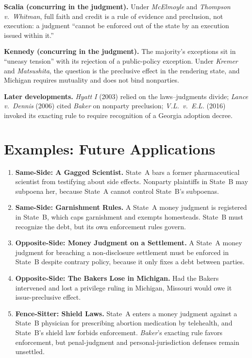 \documentclass[12pt]{article}
\begin{document}
\textbf{Scalia (concurring in the judgment).} Under \textit{McElmoyle} and \textit{Thompson v.\ Whitman}, full faith and credit is a rule of evidence and preclusion, not execution: a judgment ``cannot be enforced out of the state by an execution issued within it.''

\textbf{Kennedy (concurring in the judgment).} The majority's exceptions sit in ``uneasy tension'' with its rejection of a public-policy exception. Under \textit{Kremer} and \textit{Matsushita}, the question is the preclusive effect in the rendering state, and Michigan requires mutuality and does not bind nonparties.

\textbf{Later developments.} \textit{Hyatt I} (2003) relied on the laws--judgments divide; \textit{Lance v.\ Dennis} (2006) cited \textit{Baker} on nonparty preclusion; \textit{V.L.\ v.\ E.L.} (2016) invoked its exacting rule to require recognition of a Georgia adoption decree.

\section{Examples: Future Applications}

\begin{enumerate}
\item \textbf{Same-Side: A Gagged Scientist.} State~A bars a former pharmaceutical scientist from testifying about side effects. Nonparty plaintiffs in State~B may subpoena her, because State~A cannot control State~B's subpoenas.
\item \textbf{Same-Side: Garnishment Rules.} A State~A money judgment is registered in State~B, which caps garnishment and exempts homesteads. State~B must recognize the debt, but its own enforcement rules govern.
\item \textbf{Opposite-Side: Money Judgment on a Settlement.} A State~A money judgment for breaching a non-disclosure settlement must be enforced in State~B despite contrary policy, because it only fixes a debt between parties.
\item \textbf{Opposite-Side: The Bakers Lose in Michigan.} Had the Bakers intervened and lost a privilege ruling in Michigan, Missouri would owe it issue-preclusive effect.
\item \textbf{Fence-Sitter: Shield Laws.} State~A enters a money judgment against a State~B physician for prescribing abortion medication by telehealth, and State~B's shield law forbids enforcement. \textit{Baker}'s exacting rule favors enforcement, but penal-judgment and personal-jurisdiction defenses remain unsettled.
\end{enumerate}
\end{document}
